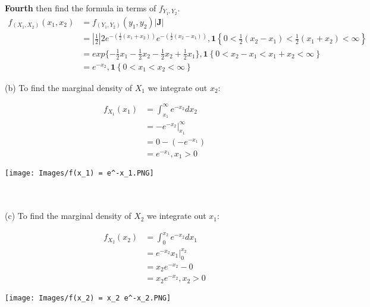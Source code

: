 \documentclass[11pt]{article}
\theoremstyle{definition}
\newcommand{\1}[1]{\mathbf{1} \left \{ #1 \right \}}
\begin{document}
\textbf{Fourth} then find the formula in terms of $f_{Y_1,Y_2}$.
\begin{align*}
    f_{(X_1,X_2)} (x_1,x_2) &= f_{(Y_1,Y_2)} (y_1,y_2)|\textbf{J}| \\
    &= \left|\frac{1}{2}\right| 2 e^{-\left(\frac{1}{2}(x_1 + x_2)\right)} e^{-\left(\frac{1}{2}(x_2 - x_1)\right)}, \1{0 < \frac{1}{2}(x_2 - x_1) < \frac{1}{2}(x_1 + x_2) < \infty} \\
    &= exp\{-\frac{1}{2}x_1 - \frac{1}{2}x_2 -\frac{1}{2}x_2 + \frac{1}{2}x_1\}, \1{0 < x_2 - x_1 < x_1 + x_2 < \infty} \\ &= e^{-x_2}, \1{0 < x_1 < x_2 < \infty}
\end{align*}

(b) To find the marginal density of $X_1$ we integrate out $x_2$: \\
\begin{minipage}{0.6\linewidth}
    \begin{align*}
        f_{X_1} (x_1) &= \int_{x_1}^{\infty} e^{-x_2} dx_2 \\
        &= -e^{-x_2} \Big|_{x_1}^{\infty} \\
        &= 0 - (-e^{-x_1}) \\
        &= e^{-x_1}, x_1 > 0
    \end{align*}
\end{minipage}
\begin{minipage}{0.4\linewidth}
    \texttt{[image: Images/f(x\_1) = e^-x\_1.PNG]}
\end{minipage} \\
\\
(c) To find the marginal density of $X_2$ we integrate out $x_1$: \\
\begin{minipage}{0.6\linewidth}
    \begin{align*}
        f_{X_2} (x_2) &= \int_0^{x_2} e^{-x_2} dx_1 \\
        &= e^{-x_2} x_1 \Big|_0^{x_2} \\
        &= x_2 e^{-x_2} - 0 \\
        &= x_2 e^{-x_2}, x_2 > 0
    \end{align*}
\end{minipage}
\begin{minipage}{0.4\linewidth}
    \texttt{[image: Images/f(x\_2) = x\_2 e^-x\_2.PNG]}
\end{minipage} \\
\end{document}
